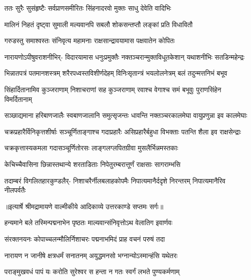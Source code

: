 \twolineshloka
{ततः सुरैः सुसंहृष्टैः सर्वप्राणसमीरितः}
{सिंहनादरवो मुक्तः साधु देवेति वादिभिः} %

\twolineshloka
{मालिनं निहतं दृष्ट्वा सुमाली मल्यवानपि}
{सबलौ शोकसन्तप्तौ लङ्कां प्रति विधावितौ} %

\twolineshloka
{गरुडस्तु समाश्वस्तः संनिवृत्य महामनाः}
{राक्षसान्द्रावयामास पक्षवातेन कोपितः} %

\fourlineindentedshloka
{नारायणोऽपीषुवराशनीभिर्-}
{विदारयामास धनुःप्रमुक्तैः}
{नक्तञ्चरान्मुक्तविधूतकेशान्}
{यथाशनीभिः सतडिन्महेन्द्रः} %

\fourlineindentedshloka
{भिन्नातपत्रं पतमानशस्त्रम्}
{शरैरपध्वस्तविशीर्णदेहम्}
{विनिःसृतान्त्रं भयलोलनेत्रम्}
{बलं तदुन्मत्तनिभं बभूव} %

\fourlineindentedshloka
{सिंहार्दितानामिव कुञ्जराणाम्}
{निशाचराणां सह कुञ्जराणाम्}
{रवाश्च वेगाश्च समं बभूवुः}
{पुराणसिंहेन विमर्दितानाम्} %

\fourlineindentedshloka
{सञ्छाद्यमाना हरिबाणजालैः}
{स्वबाणजालानि समुत्सृजन्तः}
{धावन्ति नक्तञ्चरकालमेघा}
{वायुप्रणुन्ना इव कालमेघाः} %

\fourlineindentedshloka
{चक्रप्रहारैर्विनिकृत्तशीर्षाः}
{सञ्चूर्णिताङ्गाश्च गदाप्रहारैः}
{असिप्रहारैर्बहुधा विभक्ताः}
{पतन्ति शैला इव राक्षसेन्द्राः} %

\twolineshloka
{चक्रकृत्तास्यकमला गदासञ्चूर्णितोरसः}
{लाङ्गलग्लपितग्रीवा मुसलैर्भिन्नमस्तकाः} %

\twolineshloka
{केचिच्चैवासिना छिन्नास्तथान्ये शरताडिताः}
{निपेतुरम्बरात्तूर्णं राक्षसाः सागराम्भसि} %

\fourlineindentedshloka
{तदाम्बरं विगलितहारकुण्डलैर्-}
{निशाचरैर्नीलबलाहकोपमैः}
{निपात्यमानैर्ददृशे निरन्तरम्}
{निपात्यमानैरिव नीलपर्वतैः} %


{॥इत्यार्षे श्रीमद्रामायणे वाल्मीकीये आदिकाव्ये उत्तरकाण्डे सप्तमः सर्गः॥}


\twolineshloka
{हन्यमाने बले तस्मिन्पद्मनाभेन पृष्ठतः}
{माल्यवान्संनिवृत्तोऽथ वेलातिग इवार्णवः} %

\twolineshloka
{संरक्तनयनः कोपाच्चलन्मौलिर्निशाचरः}
{पद्मनाभमिदं प्राह वचनं परुषं तदा} %

\twolineshloka
{नारायण न जानीषे क्षत्रधर्मं सनातनम्}
{अयुद्धमनसो भग्नान्योऽस्मान्हंसि यथेतरः} %

\twolineshloka
{पराङ्मुखवधं पापं यः करोति सुरेश्वर}
{स हन्ता न गतः स्वर्गं लभते पुण्यकर्मणाम्} %

